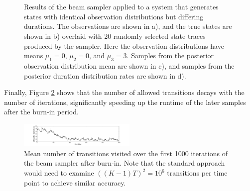 \begin{figure}
     \\
     \\
    \caption{Results of the beam sampler applied to a system that generates states with identical observation distributions but differing durations. The observations are shown in a), and the true states are shown in b) overlaid with 20 randomly selected state traces produced by the sampler. Here the observation distributions have means $\mu_1 = 0$, $\mu_2 = 0$, and $\mu_3 = 3$. Samples from the posterior observation distribution mean are shown in c), and samples from the posterior duration distribution rates are shown in d).}
    \label{fig:experiment2_results}
\end{figure}



Finally, Figure \ref{fig:allowed} shows that the number of allowed transitions decays with the number of iterations, significantly speeding up the runtime of the later samples after the burn-in period. 


\begin{figure}
    \includegraphics[width=0.5\textwidth]{../pic/number_transitions_visited.pdf}

\caption{Mean number of transitions visited over the first 1000 iterations of the beam sampler after burn-in. Note that the standard approach would need to examine $((K-1)T)^2 = 10^6$ transitions per time point to achieve similar accuracy.}
\label{fig:allowed}
\end{figure}
